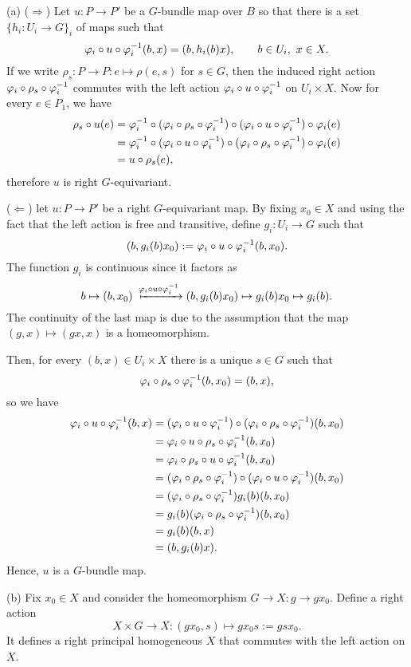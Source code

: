 \documentclass{../../large}
\begin{document}
\begin{pf}
(a)
($\Rightarrow$)
Let $u:P\to P'$ be a $G$-bundle map over $B$ so that there is a set $\{h_i:U_i\to G\}_i$ of maps such that
\[\varphi_i\circ u\circ\varphi_i^{-1}(b,x)=(b,h_i(b)x),
\qquad b\in U_i,\ x\in X.\]
If we write $\rho_s:P\to P:e\mapsto \rho(e,s)$ for $s\in G$, then the induced right action $\varphi_i\circ\rho_s\circ\varphi_i^{-1}$ commutes with the left action $\varphi_i\circ u\circ\varphi_i^{-1}$ on $U_i\times X$.
Now for every $e\in P_1$, we have
\begin{align*}
\rho_s\circ u(e)
&=\varphi_i^{-1}\circ(\varphi_i\circ\rho_s\circ\varphi_i^{-1})\circ(\varphi_i\circ u\circ\varphi_i^{-1})\circ\varphi_i(e)\\
&=\varphi_i^{-1}\circ(\varphi_i\circ u\circ\varphi_i^{-1})\circ(\varphi_i\circ\rho_s\circ\varphi_i^{-1})\circ\varphi_i(e)\\
&=u\circ\rho_s(e),
\end{align*}
therefore $u$ is right $G$-equivariant.

($\Leftarrow$) let $u:P\to P'$ be a right $G$-equivariant map.
By fixing $x_0\in X$ and using the fact that the left action is free and transitive, define $g_i:U_i\to G$ such that
\[(b,g_i(b)x_0):=\varphi_i\circ u\circ\varphi_i^{-1}(b,x_0).\]
The function $g_i$ is continuous since it factors as
\[b\mapsto(b,x_0)\xmapsto{\f_i\circ u\circ\f_i^{-1}}(b,g_i(b)x_0)\mapsto g_i(b)x_0\mapsto g_i(b).\]
The continuity of the last map is due to the assumption that the map $(g,x)\mapsto(gx,x)$ is a homeomorphism.

Then, for every $(b,x)\in U_i\times X$ there is a unique $s\in G$ such that
\[\varphi_i\circ\rho_s\circ\varphi_i^{-1}(b,x_0)=(b,x),\]
so we have
\begin{align*}
\varphi_i\circ u\circ\varphi_i^{-1}(b,x)
&=(\varphi_i\circ u\circ\varphi_i^{-1})\circ(\varphi_i\circ\rho_s\circ\varphi_i^{-1})(b,x_0)\\
&=\varphi_i\circ u\circ\rho_s\circ\varphi_i^{-1}(b,x_0)\\
&=\varphi_i\circ\rho_s\circ u\circ\varphi_i^{-1}(b,x_0)\\
&=(\varphi_i\circ\rho_s\circ\varphi_i^{-1})\circ(\varphi_i\circ u\circ\varphi_i^{-1})(b,x_0)\\
&=(\varphi_i\circ\rho_s\circ\varphi_i^{-1})g_i(b)(b,x_0)\\
&=g_i(b)(\varphi_i\circ\rho_s\circ\varphi_i^{-1})(b,x_0)\\
&=g_i(b)(b,x)\\
&=(b,g_i(b)x).
\end{align*}
Hence, $u$ is a $G$-bundle map.

(b)
Fix $x_0\in X$ and consider the homeomorphism $G\to X:g\to gx_0$.
Define a right action
\[X\times G\to X:(gx_0,s)\mapsto gx_0s:=gsx_0.\]
It defines a right principal homogeneous $X$ that commutes with the left action on $X$.


\end{pf}
\end{document}
